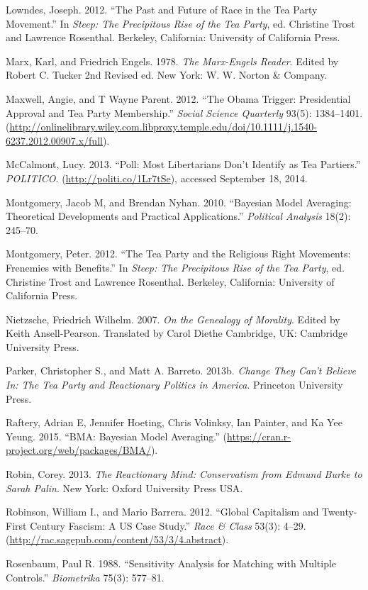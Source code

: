 \documentclass[12pt,]{article}
\begin{document}
Lowndes, Joseph. 2012. ``The Past and Future of Race in the Tea Party
Movement.'' In \emph{Steep: The Precipitous Rise of the Tea Party}, ed.
Christine Trost and Lawrence Rosenthal. Berkeley, California: University
of California Press.

Marx, Karl, and Friedrich Engels. 1978. \emph{The Marx-Engels Reader}.
Edited by Robert C. Tucker 2nd Revised ed. New York: W. W. Norton \&
Company.

Maxwell, Angie, and T Wayne Parent. 2012. ``The Obama Trigger:
Presidential Approval and Tea Party Membership.'' \emph{Social Science
Quarterly} 93(5): 1384--1401.
(\url{http://onlinelibrary.wiley.com.libproxy.temple.edu/doi/10.1111/j.1540-6237.2012.00907.x/full}).

McCalmont, Lucy. 2013. ``Poll: Most Libertarians Don't Identify as Tea
Partiers.'' \emph{POLITICO}. (\url{http://politi.co/1Lr7tSe}), accessed
September 18, 2014.

Montgomery, Jacob M, and Brendan Nyhan. 2010. ``Bayesian Model
Averaging: Theoretical Developments and Practical Applications.''
\emph{Political Analysis} 18(2): 245--70.

Montgomery, Peter. 2012. ``The Tea Party and the Religious Right
Movements: Frenemies with Benefits.'' In \emph{Steep: The Precipitous
Rise of the Tea Party}, ed. Christine Trost and Lawrence Rosenthal.
Berkeley, California: University of California Press.

Nietzsche, Friedrich Wilhelm. 2007. \emph{On the Genealogy of Morality}.
Edited by Keith Ansell-Pearson. Translated by Carol Diethe Cambridge,
UK: Cambridge University Press.

Parker, Christopher S., and Matt A. Barreto. 2013b. \emph{Change They
Can't Believe In: The Tea Party and Reactionary Politics in America}.
Princeton University Press.

Raftery, Adrian E, Jennifer Hoeting, Chris Volinksy, Ian Painter, and Ka
Yee Yeung. 2015. ``BMA: Bayesian Model Averaging.''
(\url{https://cran.r-project.org/web/packages/BMA/}).

Robin, Corey. 2013. \emph{The Reactionary Mind: Conservatism from Edmund
Burke to Sarah Palin}. New York: Oxford University Press USA.

Robinson, William I., and Mario Barrera. 2012. ``Global Capitalism and
Twenty-First Century Fascism: A US Case Study.'' \emph{Race \& Class}
53(3): 4--29. (\url{http://rac.sagepub.com/content/53/3/4.abstract}).

Rosenbaum, Paul R. 1988. ``Sensitivity Analysis for Matching with
Multiple Controls.'' \emph{Biometrika} 75(3): 577--81.
\end{document}
